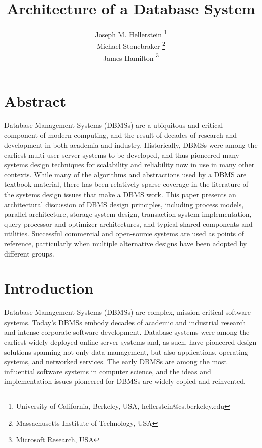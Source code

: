 \documentclass[a4paper,11pt,twoside,openright]{book}
\title{Architecture of a Database System}
\author{
Joseph M. Hellerstein \thanks{University of California, Berkeley, USA, hellerstein@cs.berkeley.edu} \\%
Michael Stonebraker \thanks{Massachusetts Institute of Technology, USA} \\%
James Hamilton \thanks{Microsoft Research, USA}}
\date{}
\begin{document}
\maketitle
\thispagestyle{empty}

\cleardoublepage
{}
\tableofcontents

\hypertarget{abstract}{%
\chapter*{Abstract}\label{abstract}}

Database Management Systems (DBMSs) are a ubiquitous and critical
component of modern computing, and the result of decades of research and
development in both academia and industry. Historically, DBMSs were
among the earliest multi-user server systems to be developed, and thus
pioneered many systems design techniques for scalability and reliability
now in use in many other contexts. While many of the algorithms and
abstractions used by a DBMS are textbook material, there has been
relatively sparse coverage in the literature of the systems design
issues that make a DBMS work. This paper presents an architectural
discussion of DBMS design principles, including process models, parallel
architecture, storage system design, transaction system implementation,
query processor and optimizer architectures, and typical shared
components and utilities. Successful commercial and open-source systems
are used as points of reference, particularly when multiple alternative
designs have been adopted by different groups.

\hypertarget{introduction}{%
\chapter{Introduction}\label{introduction}}

Database Management Systems (DBMSs) are complex, mission-critical
software systems. Today's DBMSs embody decades of academic and
industrial research and intense corporate software development. Database
systems were among the earliest widely deployed online server systems
and, as such, have pioneered design solutions spanning not only data
management, but also applications, operating systems, and networked
services. The early DBMSs are among the most influential software
systems in computer science, and the ideas and implementation issues
pioneered for DBMSs are widely copied and reinvented.
\end{document}

